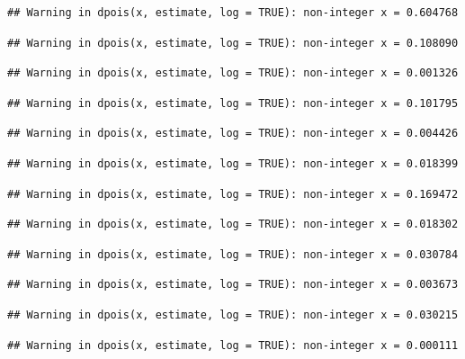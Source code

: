 \documentclass[]{article}
\begin{document}
\begin{verbatim}
## Warning in dpois(x, estimate, log = TRUE): non-integer x = 0.604768
\end{verbatim}

\begin{verbatim}
## Warning in dpois(x, estimate, log = TRUE): non-integer x = 0.108090
\end{verbatim}

\begin{verbatim}
## Warning in dpois(x, estimate, log = TRUE): non-integer x = 0.001326
\end{verbatim}

\begin{verbatim}
## Warning in dpois(x, estimate, log = TRUE): non-integer x = 0.101795
\end{verbatim}

\begin{verbatim}
## Warning in dpois(x, estimate, log = TRUE): non-integer x = 0.004426
\end{verbatim}

\begin{verbatim}
## Warning in dpois(x, estimate, log = TRUE): non-integer x = 0.018399
\end{verbatim}

\begin{verbatim}
## Warning in dpois(x, estimate, log = TRUE): non-integer x = 0.169472
\end{verbatim}

\begin{verbatim}
## Warning in dpois(x, estimate, log = TRUE): non-integer x = 0.018302
\end{verbatim}

\begin{verbatim}
## Warning in dpois(x, estimate, log = TRUE): non-integer x = 0.030784
\end{verbatim}

\begin{verbatim}
## Warning in dpois(x, estimate, log = TRUE): non-integer x = 0.003673
\end{verbatim}

\begin{verbatim}
## Warning in dpois(x, estimate, log = TRUE): non-integer x = 0.030215
\end{verbatim}

\begin{verbatim}
## Warning in dpois(x, estimate, log = TRUE): non-integer x = 0.000111
\end{verbatim}
\end{document}
